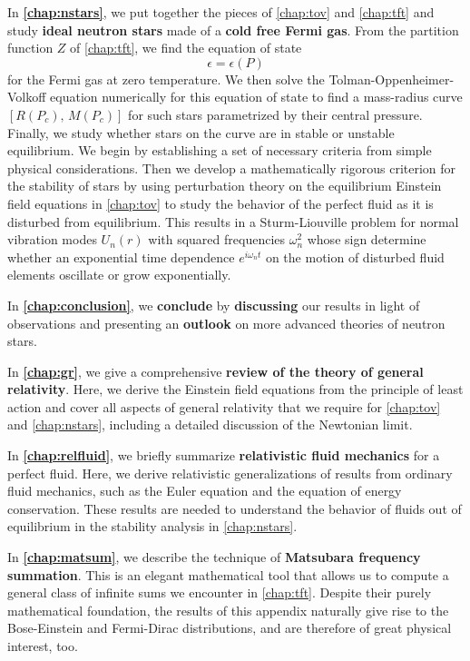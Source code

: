 In \textbf{\cref{chap:nstars}}, we put together the pieces of \cref{chap:tov} and \cref{chap:tft} and study \textbf{ideal neutron stars} made of a \textbf{cold free Fermi gas}.
From the partition function $Z$ of \cref{chap:tft}, we find the equation of state
\begin{equation*}
	\epsilon = \epsilon(P)
\end{equation*}
for the Fermi gas at zero temperature.
We then solve the Tolman-Oppenheimer-Volkoff equation numerically for this equation of state to find a mass-radius curve $[R(P_c), \, M(P_c)]$ for such stars parametrized by their central pressure.
Finally, we study whether stars on the curve are in stable or unstable equilibrium.
We begin by establishing a set of necessary criteria from simple physical considerations.
Then we develop a mathematically rigorous criterion for the stability of stars by using perturbation theory on the equilibrium Einstein field equations in \cref{chap:tov} to study the behavior of the perfect fluid as it is disturbed from equilibrium.
This results in a Sturm-Liouville problem for normal vibration modes $U_n(r)$ with squared frequencies $\omega_n^2$ whose sign determine whether an exponential time dependence $e^{i \omega_n t}$ on the motion of disturbed fluid elements oscillate or grow exponentially.

In \textbf{\cref{chap:conclusion}}, we \textbf{conclude} by \textbf{discussing} our results in light of observations and presenting an \textbf{outlook} on more advanced theories of neutron stars.

In \textbf{\cref{chap:gr}}, we give a comprehensive \textbf{review of the theory of general relativity}.
Here, we derive the Einstein field equations from the principle of least action and cover all aspects of general relativity that we require for \cref{chap:tov} and \cref{chap:nstars}, including a detailed discussion of the Newtonian limit.

In \textbf{\cref{chap:relfluid}}, we briefly summarize \textbf{relativistic fluid mechanics} for a perfect fluid.
Here, we derive relativistic generalizations of results from ordinary fluid mechanics, such as the Euler equation and the equation of energy conservation.
These results are needed to understand the behavior of fluids out of equilibrium in the stability analysis in \cref{chap:nstars}.

In \textbf{\cref{chap:matsum}}, we describe the technique of \textbf{Matsubara frequency summation}.
This is an elegant mathematical tool that allows us to compute a general class of infinite sums we encounter in \cref{chap:tft}.
Despite their purely mathematical foundation, the results of this appendix naturally give rise to the Bose-Einstein and Fermi-Dirac distributions, and are therefore of great physical interest, too.


